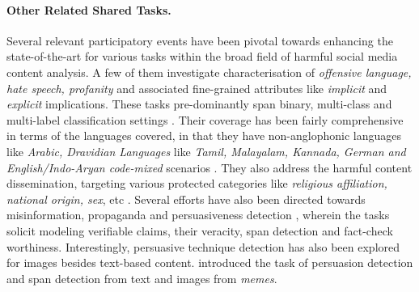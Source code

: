 \documentclass[11pt]{article}
\begin{document}
\paragraph{\bf Other Related Shared Tasks.}
Several relevant participatory events have been pivotal towards enhancing the state-of-the-art for various tasks within the broad field of harmful social media content analysis. A few of them investigate characterisation of \textit{offensive language, hate speech, profanity} and associated fine-grained attributes like \textit{implicit} and \textit{explicit} implications. These tasks pre-dominantly span binary, multi-class and multi-label classification settings \cite{mubarak-etal-2020-overview,StrussSiegelRuppenhoferetal2019}. Their coverage has been fairly comprehensive in terms of the languages covered, in that they have non-anglophonic languages like \textit{Arabic, Dravidian Languages} like \textit{Tamil, Malayalam, Kannada, German and English/Indo-Aryan code-mixed} scenarios \cite{mubarak-etal-2020-overview,chakravarthi-etal-2021-findings-shared,hasoc2021}. They also address the harmful content dissemination, targeting various protected categories like \textit{religious affiliation, national origin, sex}, etc \cite{zhang-etal-2019-grunn2019}.
Several efforts have also been directed towards misinformation, propaganda and persuasiveness detection \cite{feverous2021,shaar-etal-2021-findings,da-san-martino-etal-2020-semeval}, wherein the tasks solicit modeling verifiable claims, their veracity, span detection and fact-check worthiness. Interestingly, persuasive technique detection has also been explored for images besides text-based content. \citet{dimitrov-etal-2021-semeval} introduced the task of persuasion detection and span detection from text and images from \textit{memes}. 
\end{document}
